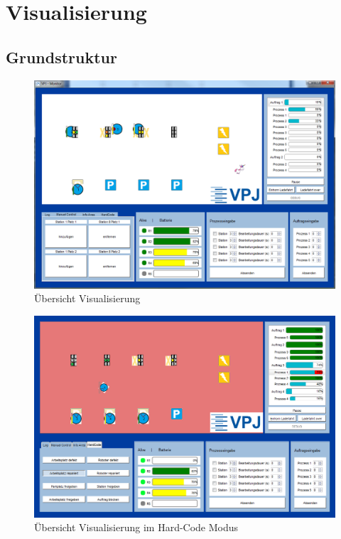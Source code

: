
\chapter{Visualisierung}
\label{sec:Visualisierung}

\section{Grundstruktur}

\begin{figure}[htb]
    \centering
    \includegraphics[width=1\textwidth]{Abbildungen/Gesamtprogramm.png}
    \caption{Übersicht Visualisierung}		
    \label{fig:Gesamtprogramm}
\end{figure}

\begin{figure}[htb]
    \centering
    \includegraphics[width=1\textwidth]{Abbildungen/GesamtprogrammROT.png}
    \caption{Übersicht Visualisierung im Hard-Code Modus}		
    \label{fig:GesamtprogrammROT}
\end{figure}

